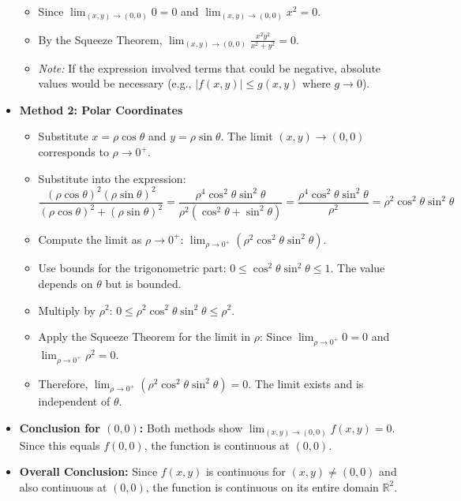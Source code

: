 \begin{cascade}
\begin{itemize}
\begin{itemize}
			      \item Since $\lim_{(x,y) \to (0,0)} 0 = 0$ and $\lim_{(x,y) \to (0,0)} x^2 = 0$.
			      \item By the Squeeze Theorem, $\lim_{(x,y) \to (0,0)} \frac{x^2 y^2}{x^2 + y^2} = 0$.
			      \item \textit{Note:} If the expression involved terms that could be negative, absolute values would be necessary (e.g., $|f(x,y)| \le g(x,y)$ where $g \to 0$).
		      \end{itemize}
		\item \textbf{Method 2: Polar Coordinates}
		      \begin{itemize}
			      \item Substitute $x = \rho \cos \theta$ and $y = \rho \sin \theta$. The limit $(x, y) \to (0, 0)$ corresponds to $\rho \to 0^+$.
			      \item Substitute into the expression:
			            \[ \frac{(\rho \cos \theta)^2 (\rho \sin \theta)^2}{(\rho \cos \theta)^2 + (\rho \sin \theta)^2} = \frac{\rho^4 \cos^2 \theta \sin^2 \theta}{\rho^2 (\cos^2 \theta + \sin^2 \theta)} = \frac{\rho^4 \cos^2 \theta \sin^2 \theta}{\rho^2} = \rho^2 \cos^2 \theta \sin^2 \theta \]
			      \item Compute the limit as $\rho \to 0^+$: $\lim_{\rho \to 0^+} (\rho^2 \cos^2 \theta \sin^2 \theta)$.
			      \item Use bounds for the trigonometric part: $0 \le \cos^2 \theta \sin^2 \theta \le 1$. The value depends on $\theta$ but is bounded.
			      \item Multiply by $\rho^2$: $0 \le \rho^2 \cos^2 \theta \sin^2 \theta \le \rho^2$.
			      \item Apply the Squeeze Theorem for the limit in $\rho$: Since $\lim_{\rho \to 0^+} 0 = 0$ and $\lim_{\rho \to 0^+} \rho^2 = 0$.
			      \item Therefore, $\lim_{\rho \to 0^+} (\rho^2 \cos^2 \theta \sin^2 \theta) = 0$. The limit exists and is independent of $\theta$.
		      \end{itemize}
		\item \textbf{Conclusion for $(0, 0)$:} Both methods show $\lim_{(x,y) \to (0,0)} f(x, y) = 0$. Since this equals $f(0, 0)$, the function is continuous at $(0, 0)$.
		\item \textbf{Overall Conclusion:} Since $f(x, y)$ is continuous for $(x,y) \neq (0,0)$ and also continuous at $(0,0)$, the function is continuous on its entire domain $\mathbb{R}^2$.
	\end{itemize}
\end{cascade}


